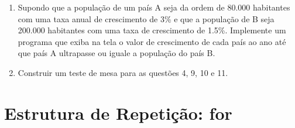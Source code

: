 \documentclass[11pt]{article}
\begin{document}
\begin{enumerate}
	\item Supondo que a população de um país A seja da ordem de 80.000 habitantes com uma taxa
	anual de crescimento de 3\% e que a população de B seja 200.000 habitantes com uma taxa de
	crescimento de 1.5\%. Implemente um programa que exiba na tela o valor de crescimento de cada
	país ao ano até que país A ultrapasse ou iguale a população do país B.
	
	\item Construir um teste de mesa para as questões 4, 9, 10 e 11.
\end{enumerate}

\newpage

\section{Estrutura de Repetição: for}
\end{document}
